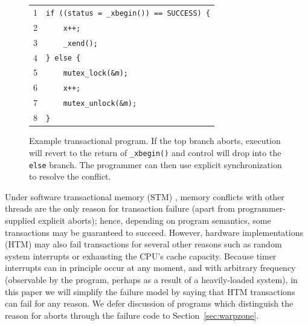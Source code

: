 \documentclass[10pt]{sigplanconf}
\begin{document}
\begin{figure}[t]
	\begin{center}
		\begin{tabular}{ll}
		1 & \texttt{if ((status = \_xbegin()) == SUCCESS) \{} \\
		2 & \texttt{~~~~x++;} \\
		3 & \texttt{~~~~\_xend();} \\
		4 & \texttt{\} else \{} \\
		5 & \texttt{~~~~mutex\_lock(\&m);} \\
		6 & \texttt{~~~~x++;} \\
		7 & \texttt{~~~~mutex\_unlock(\&m);} \\
		8 & \texttt{\}} \\
		\end{tabular}
	\end{center}
	\caption{Example transactional program.
		If the
		top branch aborts,
		execution will revert to the return of {\tt \_xbegin()}
		and control will drop into the {\tt else} branch.
		The programmer can then use explicit synchronization
		to resolve the conflict.}
	\label{fig:htm-example}
\end{figure}

Under software transactional memory (STM) \cite{stm-pldi06},
memory conflicts with other threads are the only reason for transaction failure
(apart from programmer-supplied explicit aborts);
hence, depending on program semantics, some transactions may be guaranteed to succeed.
However, hardware implementations (HTM) may also fail transactions
for several other reasons such as random system interrupts or exhausting the CPU's cache capacity.
Because timer interrupts can in principle occur at any moment,
and with arbitrary frequency (observable by the program, perhaps as a result of a heavily-loaded system),
in this paper we will simplify the failure model by saying that HTM transactions can fail for any reason.
We defer discussion of programs which distinguish the reason for aborts through the failure code to Section~\ref{sec:warpzone}.
\end{document}
